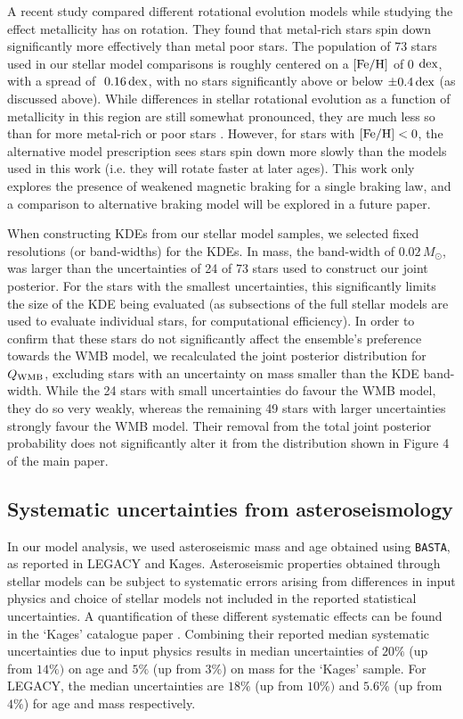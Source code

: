 A recent study \cite{amard+matt2020} compared different rotational evolution models \cite[of which we use the former in this work]{vansaders+pinsonneault2013, matt+2015} while studying the effect metallicity has on rotation. They found that metal-rich stars spin down significantly more effectively than metal poor stars. The population of 73 stars used in our stellar model comparisons is roughly centered on a $\rm{[Fe/H]}$ of 0 $\rm dex$, with a spread of $~0.16\, \rm dex$, with no stars significantly above or below $\pm 0.4\, \rm dex$ (as discussed above). While differences in stellar rotational evolution as a function of metallicity in this region are still somewhat pronounced, they are much less so than for more metal-rich or poor stars \cite[see Figure 2]{amard+matt2020}. However, for stars with $\mbox{$\rm{[Fe/H]}$} < 0$, the alternative model prescription \cite{matt+2015} sees stars spin down more slowly than the models used in this work (i.e. they will rotate faster at later ages). This work only explores the presence of weakened magnetic braking for a single braking law, and a comparison to alternative braking model will be explored in a future paper.

When constructing KDEs from our stellar model samples, we selected fixed resolutions (or band-widths) for the KDEs. In mass, the band-width of $0.02\, M_\odot$, was larger than the uncertainties of 24 of 73 stars used to construct our joint posterior. For the stars with the smallest uncertainties, this significantly limits the size of the KDE being evaluated (as subsections of the full stellar models are used to evaluate individual stars, for computational efficiency). In order to confirm that these stars do not significantly affect the ensemble's preference towards the WMB model, we recalculated the joint posterior distribution for $Q_{\rm WMB}$, excluding stars with an uncertainty on mass smaller than the KDE band-width. While the 24 stars with small uncertainties do favour the WMB model, they do so very weakly, whereas the remaining 49 stars with larger uncertainties strongly favour the WMB model. Their removal from the total joint posterior probability does not significantly alter it from the distribution shown in Figure 4 of the main paper.

\subsection{Systematic uncertainties from asteroseismology}
In our model analysis, we used asteroseismic mass and age obtained using \texttt{BASTA}, as reported in LEGACY and Kages. Asteroseismic properties obtained through stellar models can be subject to systematic errors arising from differences in input physics and choice of stellar models not included in the reported statistical uncertainties. A quantification of these different systematic effects can be found in the `Kages' catalogue paper \cite{silvaaguirre+2015}. Combining their reported median systematic uncertainties due to input physics results in median uncertainties of $20\%$ (up from $14\%)$ on age and $5\%$ (up from $3\%$) on mass for the `Kages' sample. For LEGACY, the median uncertainties are $18\%$ (up from $10\%)$ and $5.6\%$ (up from $4\%$) for age and mass respectively.

